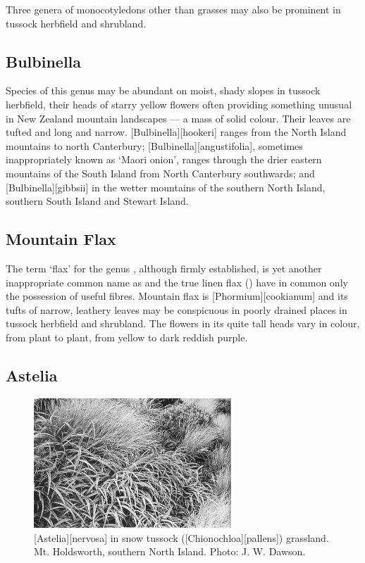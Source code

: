 Three genera of monocotyledons other than grasses may also be prominent in tussock herbfield and shrubland.

\subsection{Bulbinella}

Species of this genus may be abundant on moist, shady slopes in tussock herbfield, their heads of starry yellow flowers often providing something unusual in New Zealand mountain landscapes --- a mass of solid colour.
Their leaves are tufted and long and narrow. [Bulbinella][hookeri] ranges from the North Island mountains to north Canterbury; [Bulbinella][angustifolia], sometimes inappropriately known as `Maori onion', ranges through the drier eastern mountains of the South Island from North Canterbury southwards; and [Bulbinella][gibbsii] in the wetter mountains of the southern North Island, southern South Island and Stewart Island.

\subsection{Mountain Flax}

The term `flax' for the genus , although firmly established, is yet another inappropriate common name as  and the true linen flax () have in common only the possession of useful fibres.
Mountain flax is [Phormium][cookianum] and its tufts of narrow, leathery leaves may be conspicuous in poorly drained places in tussock herbfield and shrubland.
The flowers in its quite tall heads vary in colour, from plant to plant, from yellow to dark reddish purple.

\subsection{Astelia}

\begin{figure}
	\includegraphics[width=0.66\textwidth]{graphics/figure103astelia.jpg}
	\centering
	\caption[\emph{Astelia nervosa} in snow tussock]{[Astelia][nervosa] in snow tussock ([Chionochloa][pallens]) grassland.
	Mt. Holdsworth, southern North Island.
	Photo: J. W. Dawson.}%
	\label{fig:103astelia}
\end{figure}

